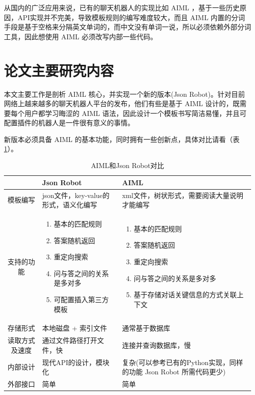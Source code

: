 \documentclass[bachelor,winfonts]{jnuthesis}
\begin{document}
从国内的广泛应用来说，已有的聊天机器人的实现比如 AIML ，基于一些历史原因，API实现并不完美，导致模板规则的编写难度较大，而且 AIML 内置的分词手段是基于空格来分隔英文单词的，而中文没有单词一说，所以必须依赖外部分词工具，因此想使用 AIML 必须改写内部一些代码。

\section{论文主要研究内容}
本文主要工作是剖析 AIML 核心，并实现一个新的版本(Json Robot)。针对目前网络上越来越多的聊天机器人平台的发布，他们有些是基于 AIML 设计的，既需要每个用户都学习晦涩的 AIML 语法，因此设计一个模板书写简洁易懂，并且可配置插件的机器人是一件很有意义的事情。

新版本必须具备 AIML 的基本功能，同时拥有一些创新点，具体对比请看（表\ref{table:t1}）。

\begin{table}[ht!]
  \centering
  \begin{tabular}{cp{38mm}p{38mm}}
    \toprule
    \textbf{} & \textbf{Json Robot} & \textbf{AIML}\\
    \midrule
    模板编写  & json文件，key-value的形式，语义化编写 &  xml文件，树状形式，需要阅读大量说明才能编写   \\
    \hline
    支持的功能     & 
    \begin{enumerate}
    \item 基本的匹配规则
    \item 答案随机返回
    \item 重定向搜索
    \item 问与答之间的关系是多对多
    \item 可配置插入第三方模板
    \end{enumerate} &
    \begin{enumerate}
    \item 基本的匹配规则
    \item 答案随机返回
    \item 重定向搜索
    \item 问与答之间的关系是多对多
    \item 基于存储对话关键信息的方式关联上下文
    \end{enumerate} \\
    \hline
    存储形式     & 本地磁盘 + 索引文件    &  通常基于数据库   \\
    \hline
    读取方式及速度     & 通过文件路径打开文件，快     & 连接并查询数据库，慢 \\
    \hline
    内部设计    & 现代API的设计，模块化   &  复杂(可以参考已有的Python实现，同样的功能 Json Robot 所需代码更少)   \\
    外部接口    & 简单   &  简单\\
    \bottomrule
  \end{tabular}
  \caption{AIML和Json Robot对比}\label{table:t1}
\end{table}
\end{document}

